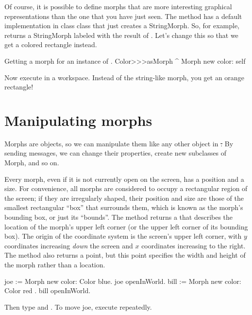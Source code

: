 \documentclass[a4paper,10pt,twoside]{book}
\begin{document}
Of course, it is possible to define morphs that are more interesting graphical representations than the one that you have just seen.
The method  has a default implementation in class  class that just creates a StringMorph.
So, for example,  returns a StringMorph labeled with the result of  .
Let's change this so that we get a colored rectangle instead.

\begin{method}{Getting a morph for an instance of .}
Color>>>asMorph
	^ Morph new color: self
\end{method}
\noindent
Now execute   in a workspace.
Instead of the string-like morph, you get an orange rectangle!


\section{Manipulating morphs}

Morphs are objects, so we can manipulate them like any other object in \st:
By sending messages, we can change their properties, create new subclasses of Morph, and so on.

Every morph, even if it is not currently open on the screen, has a position and a size.  
For convenience, all morphs are considered to occupy a rectangular region of the screen; if they are irregularly shaped, their position and size are those of the smallest rectangular ``box'' that surrounds them, which is known as the morph's bounding box, or just its ``bounds''.
The  method returns a  that describes the location of the morph's upper left corner (or the upper left corner of its bounding box).
The origin of the coordinate system is the screen's upper left corner, with $y$ coordinates increasing \emph{down} the screen and $x$ coordinates increasing to the right.
The  method also returns a point, but this point specifies the width and height of the morph rather than a location.

\begin{code}{}
joe := Morph new color: Color blue.
joe openInWorld.
bill := Morph new color: Color red .
bill openInWorld.
\end{code}
\noindent
Then type  and .
To move joe, execute  repeatedly.
\end{document}
